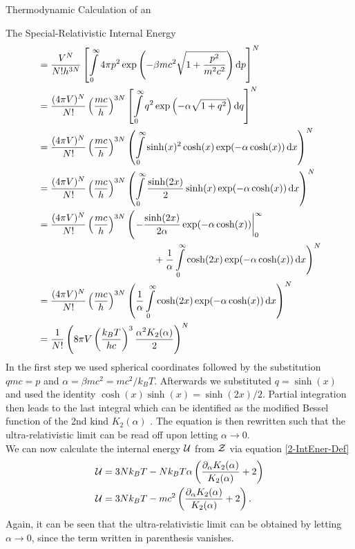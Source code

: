 \begin{section}{Thermodynamic Calculation of an }
\begin{subsection}{The Special-Relativistic Internal Energy}
\begin{align}
		&= \frac{V^N}{N!h^{3N}}\left[\int\limits_0^\infty 4\pi p^2\exp\left(-\beta mc^2\sqrt{1+\frac{p^2}{m^2c^2}} \right)\diff p\right]^N\\
		&= \frac{(4\pi V)^N}{N!}\left(\frac{mc}{h}\right)^{3N}\left[\int\limits_0^\infty q^2\exp\left(-\alpha\sqrt{1+q^2}\right)\diff q\right]^N\\
		&= \frac{(4\pi V)^N}{N!}\left(\frac{mc}{h}\right)^{3N}\left(\int\limits_0^\infty\sinh(x)^2\cosh(x)\exp(-\alpha\cosh(x))\diff x \right)^N\\
		&= \frac{(4\pi V)^N}{N!}\left(\frac{mc}{h}\right)^{3N}\left(\int\limits_0^\infty\frac{\sinh(2x)}{2}\sinh(x)\exp(-\alpha\cosh(x))\diff x \right)^N\\
		&= \frac{(4\pi V)^N}{N!}\left(\frac{mc}{h}\right)^{3N}\Biggl(\left.-\frac{\sinh(2x)}{2\alpha}\exp(-\alpha\cosh(x))\right|_0^\infty\\
		&\hspace{12em} + \frac{1}{\alpha}\int\limits_0^\infty\cosh(2x)\exp(-\alpha\cosh(x))\diff x  \Biggr)^N\\
		&= \frac{(4\pi V)^N}{N!}\left(\frac{mc}{h}\right)^{3N}\left(\frac{1}{\alpha}\int\limits_0^\infty\cosh(2x)\exp(-\alpha\cosh(x))\diff x  \right)^N\\
		&= \frac{1}{N!}\left(8\pi V\left(\frac{k_BT}{hc}\right)^{3}\frac{\alpha^2K_2(\alpha)}{2}\right)^N
		\label{2-IntEner-PartFunc}
\end{align}
In the first step we used spherical coordinates followed by the substitution $qmc=p$ and $\alpha=\beta mc^2=mc^2/k_BT$. Afterwards we substituted $q=\sinh(x)$ and used the identity $\cosh(x)\sinh(x)=\sinh(2x)/2$. Partial integration then leads to the last integral which can be identified as the modified Bessel function of the 2nd kind $K_2(\alpha)$ \cite{abramowitzPocketbookMathematicalFunctions1984}. The equation is then rewritten such that the ultra-relativistic limit can be read off upon letting $\alpha\rightarrow0$.\\ %
We can now calculate the internal energy $\mathcal{U}$ from $\mathcal{Z}$ via equation \eqref{2-IntEner-Def}
\begin{align}
    \mathcal{U} &= 3Nk_BT - Nk_BT\alpha\left(\frac{\partial_\alpha K_2(\alpha)}{K_2(\alpha)}+2\right)\\
    \mathcal{U} &= 3Nk_BT - mc^2\left(\frac{\partial_\alpha K_2(\alpha)}{K_2(\alpha)}+2\right).
    \label{2-IntEner-InternelEnergyExplicit}
\end{align}
Again, it can be seen that the ultra-relativistic limit can be obtained by letting $\alpha\rightarrow0$, since the term written in parenthesis vanishes.

\end{subsection}
\end{section}
